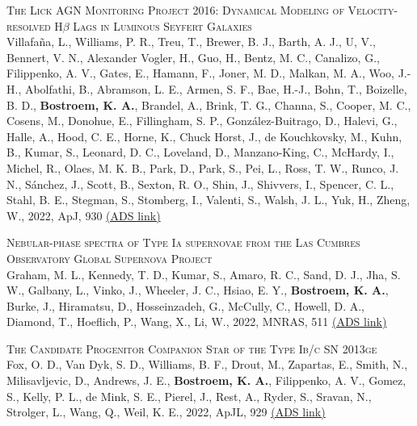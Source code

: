 \begin{revnumerate}[67]
    
    \item{\textsc{The Lick AGN Monitoring Project 2016: Dynamical Modeling of Velocity-resolved H$\beta$ Lags in Luminous Seyfert Galaxies}\\ 
    Villafa\~{n}a, L., Williams, P. R., Treu, T., Brewer, B. J., Barth, A. J., U, V., Bennert, V. N., Alexander Vogler, H., Guo, H., Bentz, M. C., Canalizo, G., Filippenko, A. V., Gates, E., Hamann, F., Joner, M. D., Malkan, M. A., Woo, J.-H., Abolfathi, B., Abramson, L. E., Armen, S. F., Bae, H.-J., Bohn, T., Boizelle, B. D., \textbf{Bostroem, K. A.}, Brandel, A., Brink, T. G., Channa, S., Cooper, M. C., Cosens, M., Donohue, E., Fillingham, S. P., Gonz\'{a}lez-Buitrago, D., Halevi, G., Halle, A., Hood, C. E., Horne, K., Chuck Horst, J., de Kouchkovsky, M., Kuhn, B., Kumar, S., Leonard, D. C., Loveland, D., Manzano-King, C., McHardy, I., Michel, R., Olaes, M. K. B., Park, D., Park, S., Pei, L., Ross, T. W., Runco, J. N., S\'{a}nchez, J., Scott, B., Sexton, R. O., Shin, J., Shivvers, I., Spencer, C. L., Stahl, B. E., Stegman, S., Stomberg, I., Valenti, S., Walsh, J. L., Yuk, H., Zheng, W., 2022, ApJ, 930 
    \color{blue}\href{https://ui.adsabs.harvard.edu/abs/2022ApJ...930...52V}{(ADS link)}\color{black}}\\
    
    \item{\textsc{Nebular-phase spectra of Type Ia supernovae from the Las Cumbres Observatory Global Supernova Project}\\ 
    Graham, M. L., Kennedy, T. D., Kumar, S., Amaro, R. C., Sand, D. J., Jha, S. W., Galbany, L., Vinko, J., Wheeler, J. C., Hsiao, E. Y., \textbf{Bostroem, K. A.}, Burke, J., Hiramatsu, D., Hosseinzadeh, G., McCully, C., Howell, D. A., Diamond, T., Hoeflich, P., Wang, X., Li, W., 2022, MNRAS, 511 
    \color{blue}\href{https://ui.adsabs.harvard.edu/abs/2022MNRAS.511.3682G}{(ADS link)}\color{black}}\\
    
    \item{\textsc{The Candidate Progenitor Companion Star of the Type Ib/c SN 2013ge}\\ 
    Fox, O. D., Van Dyk, S. D., Williams, B. F., Drout, M., Zapartas, E., Smith, N., Milisavljevic, D., Andrews, J. E., \textbf{Bostroem, K. A.}, Filippenko, A. V., Gomez, S., Kelly, P. L., de Mink, S. E., Pierel, J., Rest, A., Ryder, S., Sravan, N., Strolger, L., Wang, Q., Weil, K. E., 2022, ApJL, 929 
    \color{blue}\href{https://ui.adsabs.harvard.edu/abs/2022ApJ...929L..15F}{(ADS link)}\color{black}}\\
    

\end{revnumerate}

